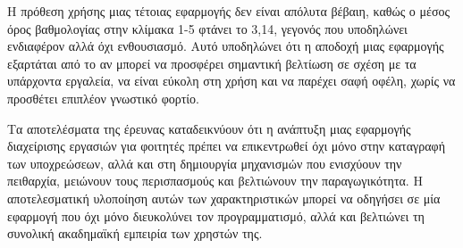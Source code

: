             Η πρόθεση χρήσης μιας τέτοιας εφαρμογής δεν είναι απόλυτα βέβαιη, καθώς ο μέσος όρος βαθμολογίας στην κλίμακα 1-5 φτάνει το 3,14, γεγονός που υποδηλώνει ενδιαφέρον αλλά όχι ενθουσιασμό. Αυτό υποδηλώνει ότι η αποδοχή μιας εφαρμογής εξαρτάται από το αν μπορεί να προσφέρει σημαντική βελτίωση σε σχέση με τα υπάρχοντα εργαλεία, να είναι εύκολη στη χρήση και να παρέχει σαφή οφέλη, χωρίς να προσθέτει επιπλέον γνωστικό φορτίο.

            Τα αποτελέσματα της έρευνας καταδεικνύουν ότι η ανάπτυξη μιας εφαρμογής διαχείρισης εργασιών για φοιτητές πρέπει να επικεντρωθεί όχι μόνο στην καταγραφή των υποχρεώσεων, αλλά και στη δημιουργία μηχανισμών που ενισχύουν την πειθαρχία, μειώνουν τους περισπασμούς και βελτιώνουν την παραγωγικότητα. Η αποτελεσματική υλοποίηση αυτών των χαρακτηριστικών μπορεί να οδηγήσει σε μία εφαρμογή που όχι μόνο διευκολύνει τον προγραμματισμό, αλλά και βελτιώνει τη συνολική ακαδημαϊκή εμπειρία των χρηστών της.